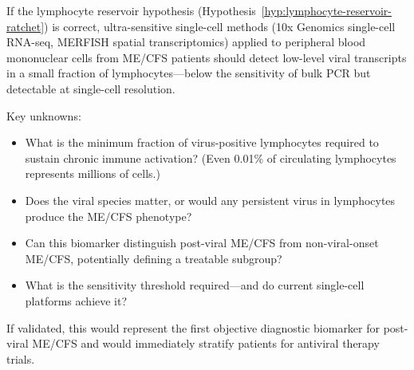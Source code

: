 \begin{open_question}
\label{oq:viral-rna-lymphocyte-biomarker}
If the lymphocyte reservoir hypothesis (Hypothesis~\ref{hyp:lymphocyte-reservoir-ratchet}) is correct, ultra-sensitive single-cell methods (10x Genomics single-cell RNA-seq, MERFISH spatial transcriptomics) applied to peripheral blood mononuclear cells from ME/CFS patients should detect low-level viral transcripts in a small fraction of lymphocytes---below the sensitivity of bulk PCR but detectable at single-cell resolution.

Key unknowns:
\begin{itemize}
    \item What is the minimum fraction of virus-positive lymphocytes required to sustain chronic immune activation? (Even 0.01\% of circulating lymphocytes represents millions of cells.)
    \item Does the viral species matter, or would any persistent virus in lymphocytes produce the ME/CFS phenotype?
    \item Can this biomarker distinguish post-viral ME/CFS from non-viral-onset ME/CFS, potentially defining a treatable subgroup?
    \item What is the sensitivity threshold required---and do current single-cell platforms achieve it?
\end{itemize}

If validated, this would represent the first objective diagnostic biomarker for post-viral ME/CFS and would immediately stratify patients for antiviral therapy trials.
\end{open_question}

